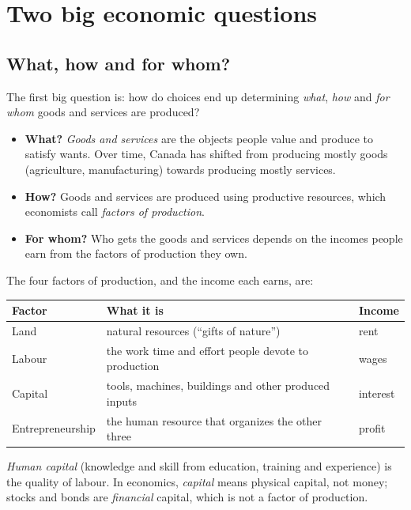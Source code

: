 \section{Two big economic questions}

\subsection{What, how and for whom?}

The first big question is: how do choices end up determining \emph{what}, \emph{how}
and \emph{for whom} goods and services are produced?

\begin{itemize}
  \item \textbf{What?} \emph{Goods and services} are the objects people value and produce
        to satisfy wants. Over time, Canada has shifted from producing mostly goods
        (agriculture, manufacturing) towards producing mostly services.
  \item \textbf{How?} Goods and services are produced using productive resources, which
        economists call \emph{factors of production}.
  \item \textbf{For whom?} Who gets the goods and services depends on the incomes people
        earn from the factors of production they own.
\end{itemize}

\begin{definition}
The four factors of production, and the income each earns, are:
\begin{center}
\begin{tabular}{lll}
\toprule
Factor & What it is & Income \\
\midrule
Land & natural resources (``gifts of nature'') & rent \\
Labour & the work time and effort people devote to production & wages \\
Capital & tools, machines, buildings and other produced inputs & interest \\
Entrepreneurship & the human resource that organizes the other three & profit \\
\bottomrule
\end{tabular}
\end{center}
\end{definition}

\begin{remark}
\emph{Human capital} (knowledge and skill from education, training and experience) is
the quality of labour. In economics, \emph{capital} means physical capital, not money;
stocks and bonds are \emph{financial} capital, which is not a factor of production.
\end{remark}

